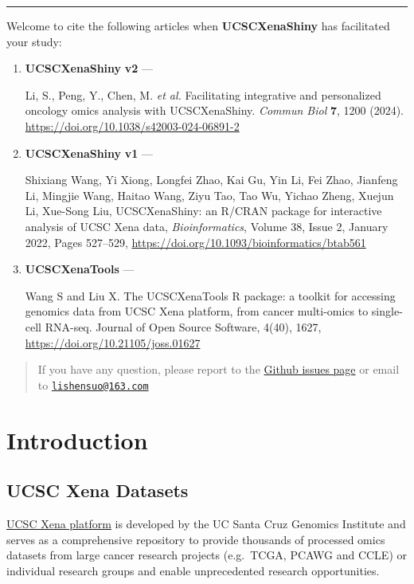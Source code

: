 \documentclass[
]{book}
\begin{document}
\begin{center}\rule{0.5\linewidth}{0.5pt}\end{center}

Welcome to cite the following articles when \textbf{UCSCXenaShiny} has facilitated your study:

\begin{enumerate}
\def\labelenumi{\arabic{enumi}.}
\item
  \textbf{UCSCXenaShiny} \textbf{v2} ---

  Li, S., Peng, Y., Chen, M. \emph{et al.} Facilitating integrative and personalized oncology omics analysis with UCSCXenaShiny. \emph{Commun Biol} \textbf{7}, 1200 (2024). \url{https://doi.org/10.1038/s42003-024-06891-2}
\item
  \textbf{UCSCXenaShiny} \textbf{v1} ---

  Shixiang Wang, Yi Xiong, Longfei Zhao, Kai Gu, Yin Li, Fei Zhao, Jianfeng Li, Mingjie Wang, Haitao Wang, Ziyu Tao, Tao Wu, Yichao Zheng, Xuejun Li, Xue-Song Liu, UCSCXenaShiny: an R/CRAN package for interactive analysis of UCSC Xena data, \emph{Bioinformatics}, Volume 38, Issue 2, January 2022, Pages 527--529, \url{https://doi.org/10.1093/bioinformatics/btab561}
\item
  \textbf{UCSCXenaTools} ---

  Wang S and Liu X. The UCSCXenaTools R package: a toolkit for accessing genomics data from UCSC Xena platform, from cancer multi-omics to single-cell RNA-seq. Journal of Open Source Software, 4(40), 1627, \url{https://doi.org/10.21105/joss.01627}
\end{enumerate}

\begin{quote}
If you have any question, please report to the \href{https://github.com/openbiox/UCSCXenaShiny/issues}{Github issues page} or email to \href{mailto:lishensuo@163.com}{\nolinkurl{lishensuo@163.com}}
\end{quote}

\chapter{Introduction}\label{intro}

\section{UCSC Xena Datasets}\label{ucsc-xena-datasets}

\href{https://xenabrowser.net/datapages/}{UCSC Xena platform} is developed by the UC Santa Cruz Genomics Institute and serves as a comprehensive repository to provide thousands of processed omics datasets from large cancer research projects (e.g.~TCGA, PCAWG and CCLE) or individual research groups and enable unprecedented research opportunities.
\end{document}
